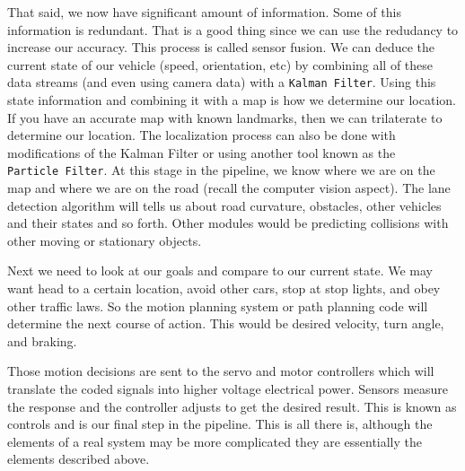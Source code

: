 That said, we now have significant amount of information. Some of this
information is redundant. That is a good thing since we can use the
redudancy to increase our accuracy. This process is called sensor
fusion. We can deduce the current state of our vehicle (speed,
orientation, etc) by combining all of these data streams (and even using
camera data) with a \texttt{Kalman\ Filter}. Using this state
information and combining it with a map is how we determine our
location. If you have an accurate map with known landmarks, then we can
trilaterate to determine our location. The localization process can also
be done with modifications of the Kalman Filter or using another tool
known as the \texttt{Particle\ Filter}. At this stage in the pipeline,
we know where we are on the map and where we are on the road (recall the
computer vision aspect). The lane detection algorithm will tells us
about road curvature, obstacles, other vehicles and their states and so
forth. Other modules would be predicting collisions with other moving or
stationary objects.

Next we need to look at our goals and compare to our current state. We
may want head to a certain location, avoid other cars, stop at stop
lights, and obey other traffic laws. So the motion planning system or
path planning code will determine the next course of action. This would
be desired velocity, turn angle, and braking.

Those motion decisions are sent to the servo and motor controllers which
will translate the coded signals into higher voltage electrical power.
Sensors measure the response and the controller adjusts to get the
desired result. This is known as controls and is our final step in the
pipeline. This is all there is, although the elements of a real system
may be more complicated they are essentially the elements described
above.
